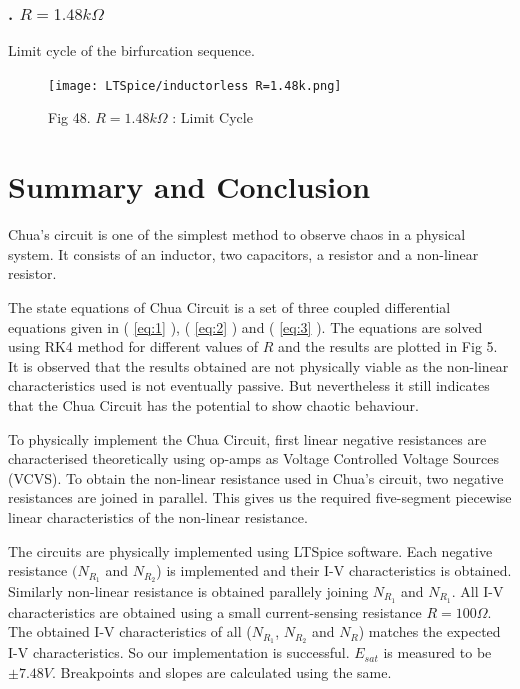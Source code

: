 \documentclass[12pt]{article}
\newcommand*{\myref}[1]{%
  \begingroup
    \hypersetup{
      linkcolor=linkequation,
      linkbordercolor=linkequation,
    }%
    \ref{#1}%
  \endgroup
}
\begin{document}
\subsubsection*{. $R=1.48k\Omega$}
Limit cycle of the birfurcation sequence.
\begin{figure}[H] %
	\centering
	\texttt{[image: LTSpice/inductorless R=1.48k.png]}
	\caption{Fig 48. $R=1.48k\Omega$ : Limit Cycle}
\end{figure}

\section{Summary and Conclusion}
Chua's circuit is one of the simplest method to observe chaos in a physical system. It consists of an inductor, two capacitors, a resistor and a non-linear resistor. 
\linebreak

The state equations of Chua Circuit is a set of three coupled differential equations given in (\myref{eq:1}), (\myref{eq:2}) and (\myref{eq:3}). The equations are solved using RK4 method for different values of $R$ and the results are plotted in Fig 5. It is observed that the results obtained are not physically viable as the non-linear characteristics used is not eventually passive. But nevertheless it still indicates that the Chua Circuit has the potential to show chaotic behaviour.\linebreak

To physically implement the Chua Circuit, first linear negative resistances are characterised theoretically using op-amps as Voltage Controlled Voltage Sources (VCVS). To obtain the non-linear resistance used in Chua's circuit, two negative resistances are joined in parallel. This gives us the required five-segment piecewise linear characteristics of the non-linear resistance. \linebreak

The circuits are physically implemented using LTSpice software. Each negative resistance $(N_{R_1}$ and $N_{R_2}$) is implemented and their I-V characteristics is obtained. Similarly non-linear resistance is obtained parallely joining $N_{R_1}$ and $N_{R_1}$. All I-V characteristics are obtained using a small current-sensing resistance $R=100\Omega$. The obtained I-V characteristics of all ($N_{R_1}$, $N_{R_2}$ and $N_{R}$) matches the expected I-V characteristics. So our implementation is successful. $E_{sat}$ is measured to be $\pm 7.48V$. Breakpoints and slopes are calculated using the same. \linebreak
\end{document}
